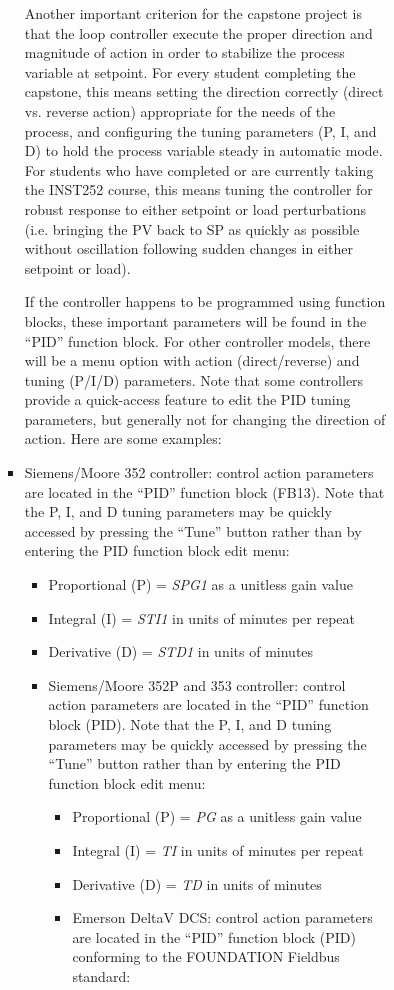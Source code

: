 \begin{itemize}
\begin{itemize}
\begin{itemize}
\begin{itemize}
\begin{itemize}
\begin{itemize}
Another important criterion for the capstone project is that the loop controller execute the proper direction and magnitude of action in order to stabilize the process variable at setpoint.  For every student completing the capstone, this means setting the direction correctly (direct vs. reverse action) appropriate for the needs of the process, and configuring the tuning parameters (P, I, and D) to hold the process variable steady in automatic mode.  For students who have completed or are currently taking the INST252 course, this means tuning the controller for robust response to either setpoint or load perturbations (i.e. bringing the PV back to SP as quickly as possible without oscillation following sudden changes in either setpoint or load).

\vskip 10pt

If the controller happens to be programmed using function blocks, these important parameters will be found in the ``PID'' function block.  For other controller models, there will be a menu option with action (direct/reverse) and tuning (P/I/D) parameters.  Note that some controllers provide a quick-access feature to edit the PID tuning parameters, but generally not for changing the direction of action.  Here are some examples:

\vskip 10pt

\item{} Siemens/Moore 352 controller: control action parameters are located in the ``PID'' function block (FB13).  Note that the P, I, and D tuning parameters may be quickly accessed by pressing the ``Tune'' button rather than by entering the PID function block edit menu:
\begin{itemize}

\item{} Proportional (P) = {\it SPG1} as a unitless gain value
\item{} Integral (I) = {\it STI1} in units of minutes per repeat
\item{} Derivative (D) = {\it STD1} in units of minutes
\vskip 10pt
\item{} Siemens/Moore 352P and 353 controller: control action parameters are located in the ``PID'' function block (PID).  Note that the P, I, and D tuning parameters may be quickly accessed by pressing the ``Tune'' button rather than by entering the PID function block edit menu:
\begin{itemize}

\item{} Proportional (P) = {\it PG} as a unitless gain value
\item{} Integral (I) = {\it TI} in units of minutes per repeat
\item{} Derivative (D) = {\it TD} in units of minutes
\vskip 10pt
\item{} Emerson DeltaV DCS: control action parameters are located in the ``PID'' function block (PID) conforming to the FOUNDATION Fieldbus standard:
\begin{itemize}


\end{itemize}
\end{itemize}
\end{itemize}
\end{itemize}
\end{itemize}
\end{itemize}
\end{itemize}
\end{itemize}
\end{itemize}
